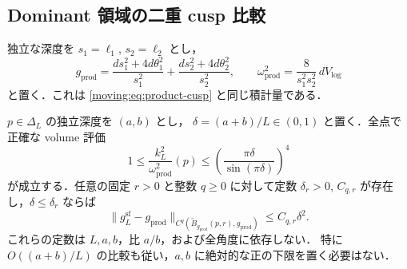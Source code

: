 \subsection{Dominant 領域の二重 cusp 比較}

独立な深度を $s_1=\ell_1$, $s_2=\ell_2$ とし，
\[
 g_{\mathrm{prod}}
   =\frac{ds_1^2+4d\theta_1^2}{s_1^2}
    +\frac{ds_2^2+4d\theta_2^2}{s_2^2},
 \qquad
 \omega_{\mathrm{prod}}^2
   =\frac8{s_1^2s_2^2}\,dV_{\log}
\]
と置く．これは \eqref{moving:eq:product-cusp} と同じ積計量である．

\begin{proposition}
\label{simplex:prop:dominant-product}
$p\in\Delta_L$ の独立深度を $(a,b)$ とし，
$\delta=(a+b)/L\in(0,1)$ と置く．全点で正確な volume 評価
\begin{equation}\label{simplex:eq:dominant-exact-volume}
 1\le\frac{k_L^2}{\omega_{\mathrm{prod}}^2}(p)
   \le\left(\frac{\pi\delta}{\sin(\pi\delta)}\right)^4
\end{equation}
が成立する．任意の固定 $r>0$ と整数 $q\ge0$ に対して定数
$\delta_r>0$, $C_{q,r}$ が存在し，$\delta\le\delta_r$ ならば
\begin{equation}\label{simplex:eq:dominant-tensor}
 \|g_L^{\mathrm{sf}}-g_{\mathrm{prod}}\|
 _{C^q(\widetilde B_{g_{\mathrm{prod}}}(p,r),g_{\mathrm{prod}})}
 \le C_{q,r}\delta^2.
\end{equation}
これらの定数は $L,a,b$，比 $a/b$，および全角度に依存しない．
特に $O((a+b)/L)$ の比較も従い，$a,b$ に絶対的な正の下限を置く必要はない．
\end{proposition}

